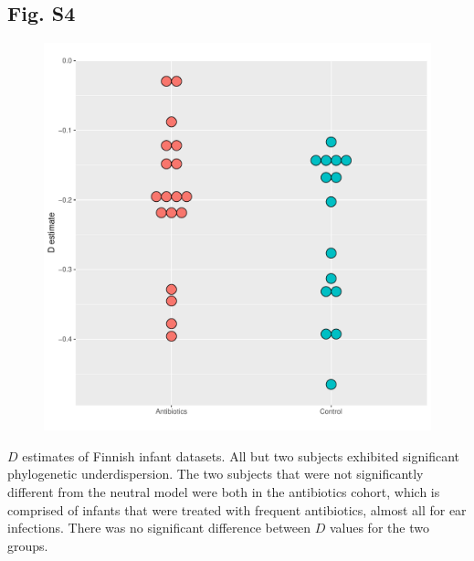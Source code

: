 \documentclass{article}
\begin{document}
{\subsection{Fig. S4}\label{sec:figureS4}
\begin{figure}[ht]
	\centering
	\includegraphics[scale=0.80]{figs/Fig_S4.pdf}
\end{figure}
\(D\) estimates of Finnish infant datasets. All but two subjects exhibited significant phylogenetic underdispersion. The two subjects that were not significantly different from the neutral model were both in the antibiotics cohort, which is comprised of infants that were treated with frequent antibiotics, almost all for ear infections. There was no significant difference between \(D\) values for the two groups. 
\newpage

}
\end{document}
